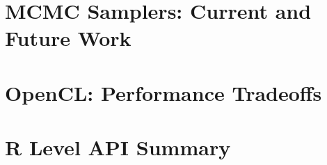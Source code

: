 \documentclass[12pt]{article}
\begin{document}
\begin{itemize}
\end{itemize}

\section{MCMC Samplers: Current and Future Work}

\section{OpenCL: Performance Tradeoffs}

\section{R Level API Summary}
\end{document}
